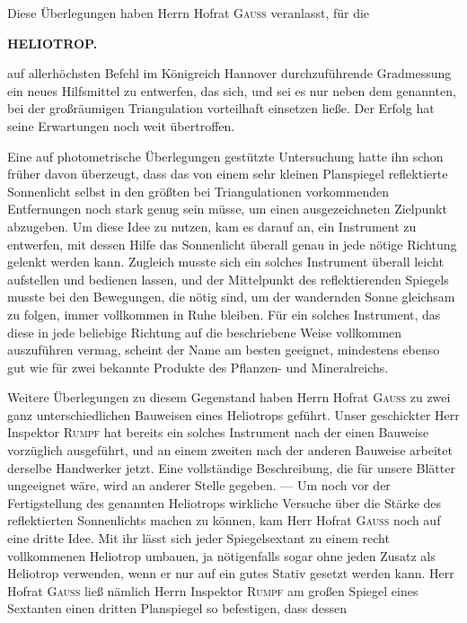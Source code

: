\par\noindent\hspace*{\parindent}Diese Überlegungen haben Herrn Hofrat \textsc{Gauss} veranlasst, für die

\par\clearpage
\noindent{}\hfill{\small\textbf{HELIOTROP.}}\hfill\null\par\medskip
\noindent auf allerhöchsten Befehl im Königreich Hannover durchzuführende Gradmessung ein neues Hilfsmittel zu entwerfen, das sich, und sei es nur neben dem genannten, bei der großräumigen Triangulation vorteilhaft einsetzen ließe. Der Erfolg hat seine Erwartungen noch weit übertroffen.

\par\noindent\hspace*{\parindent}Eine auf photometrische Überlegungen gestützte Untersuchung hatte ihn schon früher davon überzeugt, dass das von einem sehr kleinen Planspiegel reflektierte Sonnenlicht selbst in den größten bei Triangulationen vorkommenden Entfernungen noch stark genug sein müsse, um einen ausgezeichneten Zielpunkt abzugeben. Um diese Idee zu nutzen, kam es darauf an, ein Instrument zu entwerfen, mit dessen Hilfe das Sonnenlicht überall genau in jede nötige Richtung gelenkt werden kann. Zugleich musste sich ein solches Instrument überall leicht aufstellen und bedienen lassen, und der Mittelpunkt des reflektierenden Spiegels musste bei den Bewegungen, die nötig sind, um der wandernden Sonne gleichsam zu folgen, immer vollkommen in Ruhe bleiben. Für ein solches Instrument, das diese  in jede beliebige Richtung auf die beschriebene Weise vollkommen auszuführen vermag, scheint der Name  am besten geeignet, mindestens ebenso gut wie für zwei bekannte Produkte des Pflanzen- und Mineralreichs.

\par\noindent\hspace*{\parindent}Weitere Überlegungen zu diesem Gegenstand haben Herrn Hofrat \textsc{Gauss} zu zwei ganz unterschiedlichen Bauweisen eines Heliotrops geführt. Unser geschickter Herr Inspektor \textsc{Rumpf} hat bereits ein solches Instrument nach der einen Bauweise vorzüglich ausgeführt, und an einem zweiten nach der anderen Bauweise arbeitet derselbe Handwerker jetzt. Eine vollständige Beschreibung, die für unsere Blätter ungeeignet wäre, wird an anderer Stelle gegeben. --- Um noch vor der Fertigstellung des genannten Heliotrops wirkliche Versuche über die Stärke des reflektierten Sonnenlichts machen zu können, kam Herr Hofrat \textsc{Gauss} noch auf eine dritte Idee. Mit ihr lässt sich jeder Spiegelsextant zu einem recht vollkommenen Heliotrop umbauen, ja nötigenfalls sogar ohne jeden Zusatz als Heliotrop verwenden, wenn er nur auf ein gutes Stativ gesetzt werden kann. Herr Hofrat \textsc{Gauss} ließ nämlich Herrn Inspektor \textsc{Rumpf} am großen Spiegel eines Sextanten einen dritten Planspiegel so befestigen, dass dessen

